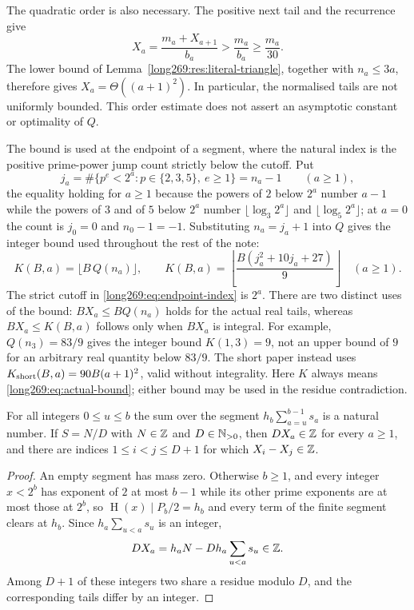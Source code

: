 \documentclass[11pt]{article}
\theoremstyle{remark}
\theoremstyle{plain}
\newcommand{\hgt}{\operatorname{H}}
\begin{document}
The quadratic order is also necessary.  The positive next tail and the
recurrence give
\[
 X_a=\frac{m_a+X_{a+1}}{b_a}>\frac{m_a}{b_a}\ge\frac{m_a}{30}.
\]
The lower bound of Lemma~\ref{long269:res:literal-triangle}, together
with $n_a\le3a$, therefore gives $X_a=\Theta((a+1)^2)$.  In particular,
the normalised tails are not uniformly bounded.  This order estimate
does not assert an asymptotic constant or optimality of $Q$.

The bound is used at the endpoint of a segment, where the natural index is the
positive prime-power jump count strictly below the cutoff.  Put
\begin{equation}\label{long269:eq:endpoint-index}
 j_a=\#\{p^{e}<2^{a}:p\in\{2,3,5\},\ e\ge1\}=n_a-1\qquad(a\ge1),
\end{equation}
the equality holding for $a\ge1$ because the powers of $2$ below $2^{a}$ number
$a-1$ while the powers of $3$ and of $5$ below $2^{a}$ number
$\lfloor\log_3 2^{a}\rfloor$ and $\lfloor\log_5 2^{a}\rfloor$; at $a=0$ the
count is $j_0=0$ and $n_0-1=-1$.  Substituting $n_a=j_a+1$ into $Q$ gives the
integer bound used throughout the rest of the note:
\begin{equation}\label{long269:eq:actual-bound}
 K(B,a)=\bigl\lfloor B\,Q(n_a)\bigr\rfloor,
 \qquad
 K(B,a)=\left\lfloor\frac{B(j_a^{2}+10j_a+27)}9\right\rfloor\quad(a\ge1).
\end{equation}
The strict cutoff in \eqref{long269:eq:endpoint-index} is $2^a$.
There are two distinct uses of the bound: $BX_a\le BQ(n_a)$ holds for the
actual real tails, whereas $BX_a\le K(B,a)$ follows only when $BX_a$
is integral. For example, $Q(n_3)=83/9$ gives the integer bound
$K(1,3)=9$, not an upper bound of $9$ for an arbitrary real quantity
below $83/9$. The short paper instead uses
$K_{\rm short}(B,a)=90B(a+1)^2$, valid without integrality. Here $K$
always means \eqref{long269:eq:actual-bound}; either bound may be used
in the residue contradiction.



\begin{lemma}\label{long269:res:all-scale-lattice}
For all integers $0\le u\le b$ the sum over the segment $h_b\sum_{a=u}^{b-1}s_a$ is a
natural number.  If $S=N/D$ with $N\in\mathbb{Z}$ and $D\in\mathbb{N}_{>0}$, then $DX_a\in\mathbb{Z}$
for every $a\ge1$, and there are indices $1\le i<j\le D+1$ for which
$X_i-X_j\in\mathbb{Z}$.
\end{lemma}

\begin{proof}
An empty segment has mass zero.  Otherwise $b\ge1$, and every integer $x<2^{b}$
has exponent of $2$ at most $b-1$ while its other prime exponents are at
most those at $2^{b}$, so $\hgt(x)\mid P_b/2=h_b$ and every term of the
finite segment clears at $h_b$.  Since $h_a\sum_{u<a}s_u$ is an integer,
\[
 DX_a=h_aN-Dh_a\sum_{u<a}s_u\in\mathbb{Z}.
\]
Among $D+1$ of these integers two share a residue
modulo $D$, and the corresponding tails differ by an integer.
\end{proof}
\end{document}
